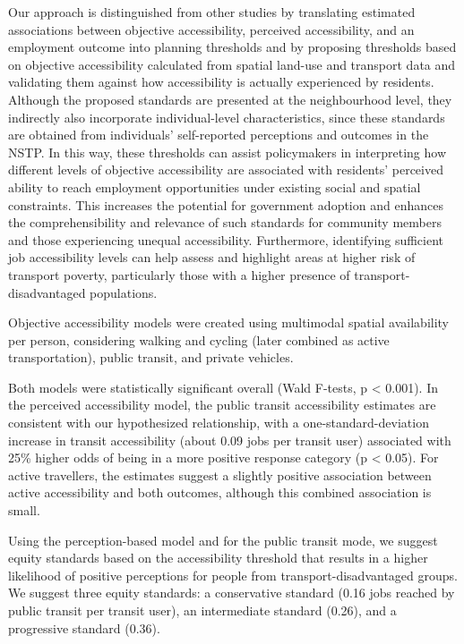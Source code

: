 \documentclass[preprint, 3p,
authoryear]{elsarticle} %
\begin{document}
Our approach is distinguished from other studies by translating
estimated associations between objective accessibility, perceived
accessibility, and an employment outcome into planning thresholds and by
proposing thresholds based on objective accessibility calculated from
spatial land-use and transport data and validating them against how
accessibility is actually experienced by residents. Although the
proposed standards are presented at the neighbourhood level, they
indirectly also incorporate individual-level characteristics, since
these standards are obtained from individuals' self-reported perceptions
and outcomes in the NSTP. In this way, these thresholds can assist
policymakers in interpreting how different levels of objective
accessibility are associated with residents' perceived ability to reach
employment opportunities under existing social and spatial constraints.
This increases the potential for government adoption and enhances the
comprehensibility and relevance of such standards for community members
and those experiencing unequal accessibility. Furthermore, identifying
sufficient job accessibility levels can help assess and highlight areas
at higher risk of transport poverty, particularly those with a higher
presence of transport-disadvantaged populations.

Objective accessibility models were created using multimodal spatial
availability per person, considering walking and cycling (later combined
as active transportation), public transit, and private vehicles.

Both models were statistically significant overall (Wald F-tests, p
\textless{} 0.001). In the perceived accessibility model, the public
transit accessibility estimates are consistent with our hypothesized
relationship, with a one-standard-deviation increase in transit
accessibility (about 0.09 jobs per transit user) associated with 25\%
higher odds of being in a more positive response category (p \textless{}
0.05). For active travellers, the estimates suggest a slightly positive
association between active accessibility and both outcomes, although
this combined association is small.

Using the perception-based model and for the public transit mode, we
suggest equity standards based on the accessibility threshold that
results in a higher likelihood of positive perceptions for people from
transport-disadvantaged groups. We suggest three equity standards: a
conservative standard (0.16 jobs reached by public transit per transit
user), an intermediate standard (0.26), and a progressive standard
(0.36).
\end{document}
